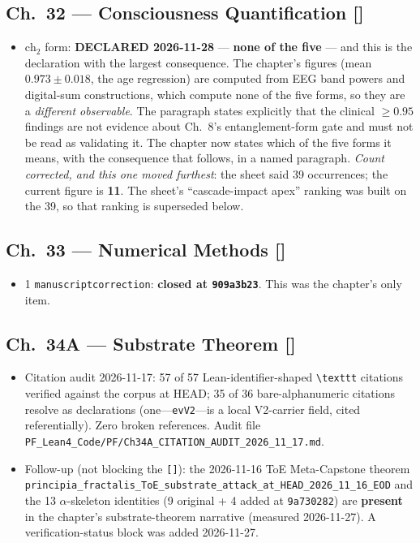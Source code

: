 \subsection*{Ch.~32 --- Consciousness Quantification \hfill [\checkmark]}
\begin{itemize}
\item $\mathrm{ch}_2$ form: \textbf{DECLARED 2026-11-28} --- \textbf{none of the five} --- and this is the declaration with the largest consequence. The chapter's figures (mean $0.973 \pm 0.018$, the age regression) are computed from EEG band powers and digital-sum constructions, which compute none of the five forms, so they are a \emph{different observable}. The paragraph states explicitly that the clinical $\geq 0.95$ findings are not evidence about Ch.~8's entanglement-form gate and must not be read as validating it. The chapter now states which of the five forms it means, with the consequence that follows, in a named paragraph.
\emph{Count corrected, and this one moved furthest}: the sheet said 39
occurrences; the current figure is \textbf{11}. The sheet's ``cascade-impact
apex'' ranking was built on the 39, so that ranking is superseded below.
\end{itemize}

\subsection*{Ch.~33 --- Numerical Methods \hfill [\checkmark]}
\begin{itemize}
\item 1 \texttt{manuscriptcorrection}: \textbf{closed at \texttt{909a3b23}}.
This was the chapter's only item.
\end{itemize}

\subsection*{Ch.~34A --- Substrate Theorem \hfill [\checkmark]}
\begin{itemize}
\item Citation audit 2026-11-17: 57 of 57 Lean-identifier-shaped
\texttt{\textbackslash texttt} citations verified against the corpus at
HEAD; 35 of 36 bare-alphanumeric citations resolve as declarations
(one---\texttt{evV2}---is a local V2-carrier field, cited
referentially). Zero broken references. Audit file
\texttt{PF\_Lean4\_Code/PF/Ch34A\_CITATION\_AUDIT\_2026\_11\_17.md}.
\item Follow-up (not blocking the \texttt{[\checkmark]}): the
2026-11-16 ToE Meta-Capstone theorem
\texttt{principia\_fractalis\_ToE\_substrate\_attack\_at\_HEAD\_2026\_11\_16\_EOD}
and the 13 $\alpha$-skeleton identities (9 original + 4 added at
\texttt{9a730282}) are \textbf{present} in the chapter's substrate-theorem
narrative (measured 2026-11-27). A verification-status block was added
2026-11-27.
\end{itemize}

